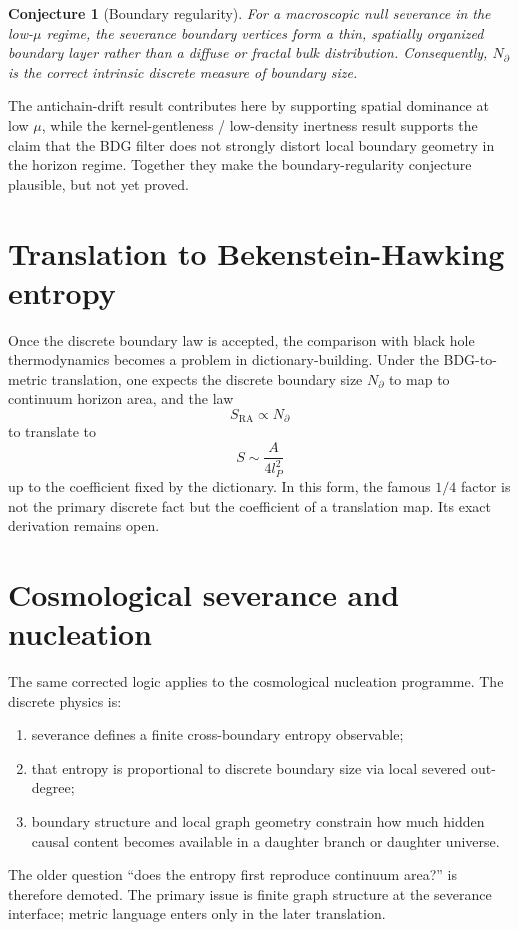\documentclass[11pt]{article}
\newtheorem{conjecture}{Conjecture}
\newcommand{\SRa}{S_{\mathrm{RA}}}
\begin{document}
\begin{conjecture}[Boundary regularity]
For a macroscopic null severance in the low-$\mu$ regime, the severance boundary vertices form a thin, spatially organized boundary layer rather than a diffuse or fractal bulk distribution. Consequently, $N_\partial$ is the correct intrinsic discrete measure of boundary size.
\end{conjecture}

The antichain-drift result contributes here by supporting spatial dominance at low $\mu$, while the kernel-gentleness / low-density inertness result supports the claim that the BDG filter does not strongly distort local boundary geometry in the horizon regime. Together they make the boundary-regularity conjecture plausible, but not yet proved.

\section{Translation to Bekenstein-Hawking entropy}
Once the discrete boundary law is accepted, the comparison with black hole thermodynamics becomes a problem in dictionary-building. Under the BDG-to-metric translation, one expects the discrete boundary size $N_\partial$ to map to continuum horizon area, and the law
\[
\SRa\propto N_\partial
\]
to translate to
\[
S\sim \frac{A}{4l_P^2}
\]
up to the coefficient fixed by the dictionary. In this form, the famous $1/4$ factor is not the primary discrete fact but the coefficient of a translation map. Its exact derivation remains open.

\section{Cosmological severance and nucleation}
The same corrected logic applies to the cosmological nucleation programme. The discrete physics is:
\begin{enumerate}[label=(\arabic*)]
    \item severance defines a finite cross-boundary entropy observable;
    \item that entropy is proportional to discrete boundary size via local severed out-degree;
    \item boundary structure and local graph geometry constrain how much hidden causal content becomes available in a daughter branch or daughter universe.
\end{enumerate}

The older question ``does the entropy first reproduce continuum area?'' is therefore demoted. The primary issue is finite graph structure at the severance interface; metric language enters only in the later translation.
\end{document}
